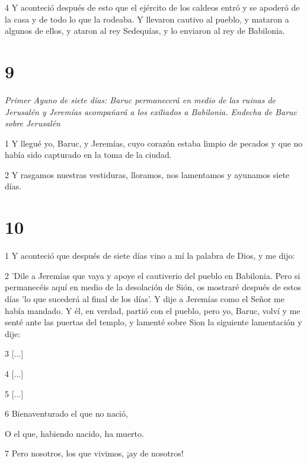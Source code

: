 \par 4 Y aconteció después de esto que el ejército de los caldeos entró y se apoderó de la casa y de todo lo que la rodeaba. Y llevaron cautivo al pueblo, y mataron a algunos de ellos, y ataron al rey Sedequías, y lo enviaron al rey de Babilonia.

\chapter{9}

\par \textit{Primer Ayuno de siete días: Baruc permanecerá en medio de las ruinas de Jerusalén y Jeremías acompañará a los exiliados a Babilonia. Endecha de Baruc sobre Jerusalén}

\par 1 Y llegué yo, Baruc, y Jeremías, cuyo corazón estaba limpio de pecados y que no había sido capturado en la toma de la ciudad.

\par 2 Y rasgamos nuestras vestiduras, lloramos, nos lamentamos y ayunamos siete días.

\chapter{10}

\par 1 Y aconteció que después de siete días vino a mí la palabra de Dios, y me dijo:

\par 2 'Dile a Jeremías que vaya y apoye el cautiverio del pueblo en Babilonia. Pero si permanecéis aquí en medio de la desolación de Sión, os mostraré después de estos días 'lo que sucederá al final de los días'. Y dije a Jeremías como el Señor me había mandado. Y él, en verdad, partió con el pueblo, pero yo, Baruc, volví y me senté ante las puertas del templo, y lamenté sobre Sion la siguiente lamentación y dije:

\par 3 [...]

\par 4 [...]

\par 5 [...]

\par 6 Bienaventurado el que no nació,

\par O el que, habiendo nacido, ha muerto.

\par 7 Pero nosotros, los que vivimos, ¡ay de nosotros!

